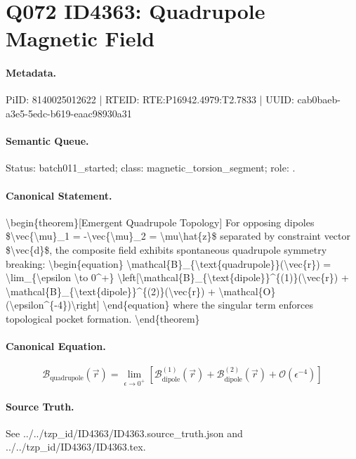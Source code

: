 \section*{Q072 ID4363: Quadrupole Magnetic Field}
\paragraph{Metadata.}
PiID: 8140025012622 | RTEID: RTE:P16942.4979:T2.7833 | UUID: cab0baeb-a3e5-5edc-b619-eaac98930a31

\paragraph{Semantic Queue.}
Status: batch011\_started; class: magnetic\_torsion\_segment; role: .

\paragraph{Canonical Statement.}
\textbackslash{}begin\{theorem\}[Emergent Quadrupole Topology] For opposing dipoles \$\textbackslash{}vec\{\textbackslash{}mu\}\_1 = -\textbackslash{}vec\{\textbackslash{}mu\}\_2 = \textbackslash{}mu\textbackslash{}hat\{z\}\$ separated by constraint vector \$\textbackslash{}vec\{d\}\$, the composite field exhibits spontaneous quadrupole symmetry breaking: \textbackslash{}begin\{equation\} \textbackslash{}mathcal\{B\}\_\{\textbackslash{}text\{quadrupole\}\}(\textbackslash{}vec\{r\}) = \textbackslash{}lim\_\{\textbackslash{}epsilon \textbackslash{}to 0\textasciicircum{}+\} \textbackslash{}left[\textbackslash{}mathcal\{B\}\_\{\textbackslash{}text\{dipole\}\}\textasciicircum{}\{(1)\}(\textbackslash{}vec\{r\}) + \textbackslash{}mathcal\{B\}\_\{\textbackslash{}text\{dipole\}\}\textasciicircum{}\{(2)\}(\textbackslash{}vec\{r\}) + \textbackslash{}mathcal\{O\}(\textbackslash{}epsilon\textasciicircum{}\{-4\})\textbackslash{}right] \textbackslash{}end\{equation\} where the singular term enforces topological pocket formation. \textbackslash{}end\{theorem\}

\paragraph{Canonical Equation.}
\[
\begin{equation} \mathcal{B}_{\text{quadrupole}}(\vec{r}) = \lim_{\epsilon \to 0^+} \left[\mathcal{B}_{\text{dipole}}^{(1)}(\vec{r}) + \mathcal{B}_{\text{dipole}}^{(2)}(\vec{r}) + \mathcal{O}(\epsilon^{-4})\right] \end{equation}
\]

\paragraph{Source Truth.}
See ../../tzp\_id/ID4363/ID4363.source\_truth.json and ../../tzp\_id/ID4363/ID4363.tex.
